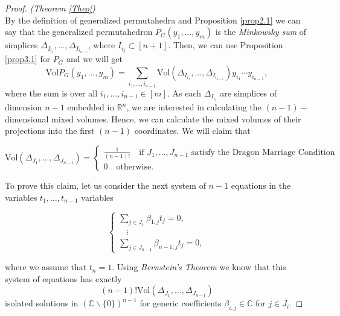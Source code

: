 \documentclass[english,11pt]{article}
\theoremstyle{definition}
\theoremstyle{definition}
\theoremstyle{definition}
\theoremstyle{remark}
\theoremstyle{definition}
\begin{document}
\begin{proof}\textit{(Theorem \ref{Theo})}\\
By the definition of generalized permutahedra and Proposition \ref{prop2.1} we can say that the generalized permutahedron $P_G (y_1, \dots, y_m)$ is the \textit{Minkowsky sum} of simplices $\Delta_{I_{i_1}}, \dots, \Delta_{I_{i_{n-1}}}$, where $I_{i_j}\subset [n+1]$.
Then, we can use Proposition \ref{prop3.1} for $P_G$ and we will get
$$\text{Vol}P_G(y_1, \dots, y_m)= \sum_{i_1,\dots, i_{n-1}}\text{Vol}(\Delta_{I_{i_1}}, \dots, \Delta_{I_{i_{n-1}}})y_{i_1}\cdots y_{i_{n-1}},$$
where the sum is over all $i_1,\dots, i_{n-1} \in [m]$.
As each $\Delta_{I_{i_i}}$ are simplices of dimension $n-1$ embedded in $\mathbb{R}^n$, we are interested in calculating the $(n-1)-$dimensional mixed volumes. Hence, we can calculate the mixed volumes of their projections into the first $(n-1)$ coordinates.
We will claim that

$$
\text{Vol}(\Delta_{J_1}, \dots, \Delta_{J_{n-1}})=
  \begin{cases}
    \frac{1}{(n-1)!} \quad \text{if } J_1, \dots, J_{n-1} \text{ satisfy the Dragon Marriage Condition}\\
0 \quad \text{otherwise.}
\end{cases}  
$$

To prove this claim, let us consider the next system of $n-1$ equations in the variables $t_1, \dots, t_{n-1}$ variables

\begin{center}
    $$\begin{cases}
      \sum_{j\in J_1} \beta_{1,j}t_j=0,\\
      \quad \vdots\\
      \sum_{j\in J_{n-1}} \beta_{n-1,j}t_j=0,
    \end{cases}$$
\end{center}
where we assume that $t_n=1$. Using \textit{Bernstein's Theorem} we know that this system of equations has exactly
$$(n-1)! \text{Vol}(\Delta_{J_1}, \dots, \Delta_{J_{n-1}})$$ isolated solutions in $(\mathbb{C}\backslash \{0\})^{n-1}$ for generic coefficients $\beta_{i,j}\in \mathbb{C}$ for $j \in J_i$.


\end{proof}
\end{document}
